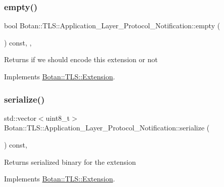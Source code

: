 \subsubsection{\texorpdfstring{empty()}{empty()}}
{\footnotesize\ttfamily bool Botan\+::\+T\+L\+S\+::\+Application\+\_\+\+Layer\+\_\+\+Protocol\+\_\+\+Notification\+::empty (\begin{DoxyParamCaption}{ }\end{DoxyParamCaption}) const\hspace{0.3cm}{\ttfamily [inline]}, {\ttfamily [override]}, {\ttfamily [virtual]}}

\begin{DoxyReturn}{Returns}
if we should encode this extension or not 
\end{DoxyReturn}


Implements \hyperlink{class_botan_1_1_t_l_s_1_1_extension_aa850b9be2322f94e7c65e583cd51acc5}{Botan\+::\+T\+L\+S\+::\+Extension}.

\mbox{\label{class_botan_1_1_t_l_s_1_1_application___layer___protocol___notification_a228264ad294e0569398e3e2575bc1e39}} 
\subsubsection{\texorpdfstring{serialize()}{serialize()}}
{\footnotesize\ttfamily std\+::vector$<$uint8\+\_\+t$>$ Botan\+::\+T\+L\+S\+::\+Application\+\_\+\+Layer\+\_\+\+Protocol\+\_\+\+Notification\+::serialize (\begin{DoxyParamCaption}{ }\end{DoxyParamCaption}) const\hspace{0.3cm}{\ttfamily [override]}, {\ttfamily [virtual]}}

\begin{DoxyReturn}{Returns}
serialized binary for the extension 
\end{DoxyReturn}


Implements \hyperlink{class_botan_1_1_t_l_s_1_1_extension_a56788726ad2526db54e5a26039cb69db}{Botan\+::\+T\+L\+S\+::\+Extension}.

